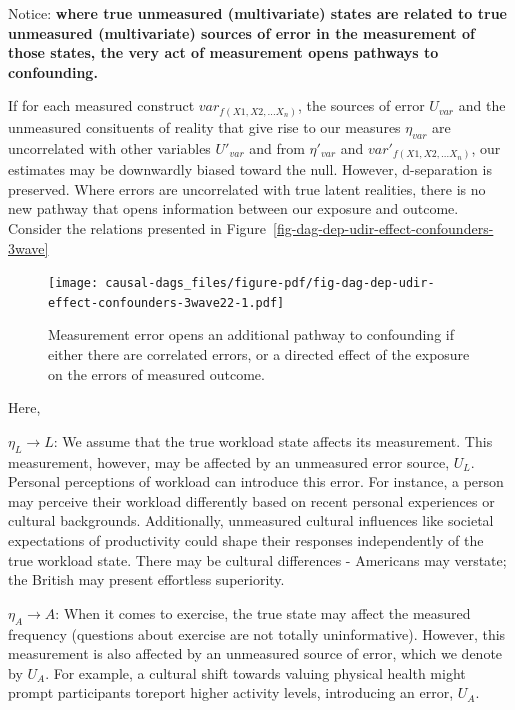 \documentclass[
  singlecolumn]{report}
\begin{document}
Notice: \textbf{where true unmeasured (multivariate) states are related
to true unmeasured (multivariate) sources of error in the measurement of
those states, the very act of measurement opens pathways to
confounding.}

If for each measured construct \(var_{f(X1, X2,\dots X_n)}\), the
sources of error \(U_{var}\) and the unmeasured consituents of reality
that give rise to our measures \(\eta_{var}\) are uncorrelated with
other variables \(U\prime_{var}\) and from \(\eta\prime_{var}\) and
\(var\prime_{f(X1, X2,\dots X_n)}\), our estimates may be downwardly
biased toward the null. However, d-separation is preserved. Where errors
are uncorrelated with true latent realities, there is no new pathway
that opens information between our exposure and outcome. Consider the
relations presented in
Figure~\ref{fig-dag-dep-udir-effect-confounders-3wave}

\begin{figure}

{\centering \texttt{[image: causal-dags\_files/figure-pdf/fig-dag-dep-udir-effect-confounders-3wave22-1.pdf]}

}

\caption{\label{fig-dag-dep-udir-effect-confounders-3wave22}Measurement
error opens an additional pathway to confounding if either there are
correlated errors, or a directed effect of the exposure on the errors of
measured outcome.}

\end{figure}

Here,

\(\eta_L \rightarrow L\): We assume that the true workload state affects
its measurement. This measurement, however, may be affected by an
unmeasured error source, \(U_{L}\). Personal perceptions of workload can
introduce this error. For instance, a person may perceive their workload
differently based on recent personal experiences or cultural
backgrounds. Additionally, unmeasured cultural influences like societal
expectations of productivity could shape their responses independently
of the true workload state. There may be cultural differences -
Americans may verstate; the British may present effortless superiority.

\(\eta_A \rightarrow A\): When it comes to exercise, the true state may
affect the measured frequency (questions about exercise are not totally
uninformative). However, this measurement is also affected by an
unmeasured source of error, which we denote by \(U_{A}\). For example, a
cultural shift towards valuing physical health might prompt participants
toreport higher activity levels, introducing an error, \(U_{A}\).
\end{document}
